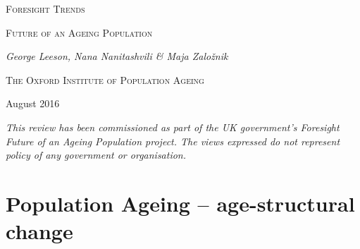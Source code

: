 \documentclass[11 pt, a4paper]{report}
\begin{document}
\begin{titlepage}
	\centering

	{\scshape\Large Foresight Trends\par}
	\vspace{2cm}
	{\scshape\LARGE Future of an Ageing Population\par}
	\vspace{1.5cm}
	{\itshape George Leeson, Nana Nanitashvili \& Maja Zalo\v znik\par}
	\vspace{0.5cm}
	{\large\scshape The Oxford Institute of Population Ageing\par}
	\vspace{0.5cm}
	\small {August 2016}\par

	\vfill


\emph{This review has been commissioned as part of the UK government's Foresight Future of an Ageing Population project. The views expressed do not represent policy of any government or organisation.}
\end{titlepage}
%

\setcounter{secnumdepth}{1}
\setcounter{tocdepth}{5}
\tableofcontents

\chapter{Population Ageing – age-structural change} %
\end{document}
